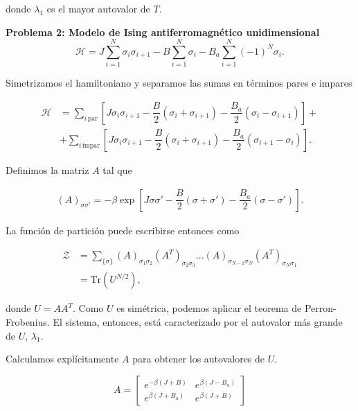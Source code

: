 \documentclass[10pt]{article}
\begin{document}
donde $\lambda_1$ es el mayor autovalor de $T$. 

\pagebreak


\textbf{Problema 2: Modelo de Ising antiferromagn\'etico unidimensional}
\\

\begin{equation}
\mathcal{H} = J\sum_{i=1}^N \sigma_i \sigma_{i+1} - B \sum_{i=1}^N \sigma_i- B_a \sum_{i=1}^N (-1)^N \sigma_i.
\end{equation}

Simetrizamos el hamiltoniano y separamos las sumas en t\'erminos pares e impares

\begin{align}
\mathcal{H} &= \sum_{i\,\text{par}} \left[J \sigma_i \sigma_{i+1} - \dfrac{B}{2} \left( \sigma_i + \sigma_{i+1}\right) -\dfrac{B_a}{2} \left( \sigma_i - \sigma_{i+1}\right) \right] + \nonumber \\
&+ \sum_{i\,\text{impar}} \left[J \sigma_i \sigma_{i+1} - \dfrac{B}{2} \left( \sigma_i + \sigma_{i+1}\right) -\dfrac{B_a}{2} \left( \sigma_{i+1} - \sigma_i\right) \right].
\end{align}

Definimos la matriz $A$ tal que 

\begin{align*}
(A)_{\sigma\sigma'} = -\beta\exp\left[ J \sigma \sigma' - \dfrac{B}{2} \left( \sigma + \sigma'\right) -\dfrac{B_a}{2} \left( \sigma - \sigma'\right) \right].
\end{align*}

La funci\'on de partici\'on puede escribirse entonces como

\begin{align}
\mathcal{Z} &= \sum_{\lbrace\sigma\rbrace} (A)_{\sigma_1\sigma_2} (A^T)_{\sigma_2\sigma_3}\dots (A)_{\sigma_{N-1}\sigma_N} (A^T)_{\sigma_N\sigma_1} \nonumber \\
&= \text{Tr}\left( U^{N/2} \right),
\end{align}

donde $U=AA^T$. Como $U$ es sim\'etrica, podemos aplicar el teorema de Perron-Frobenius. El sistema, entonces, est\'a caracterizado por el autovalor m\'as grande de $U$, $\lambda_1$.

Calculamos expl\'icitamente $A$ para obtener los autovalores de $U$.

\begin{equation}
A = 
\begin{bmatrix}
e^{-\beta(J+B)} & e^{\beta(J-B_a)}\\
e^{\beta(J+B_a)} & e^{\beta(J+B)}
\end{bmatrix}
\end{equation}
\end{document}
